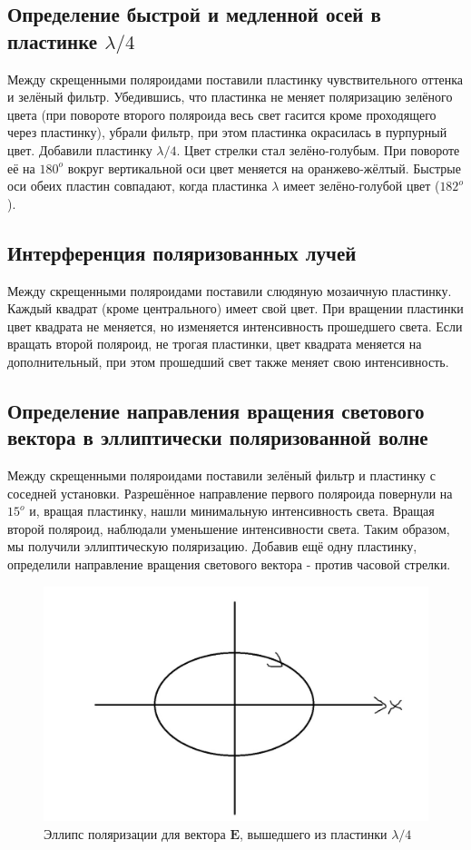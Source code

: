 \subsection*{Определение быстрой и медленной осей в пластинке $\lambda/4$}
Между скрещенными поляроидами поставили пластинку чувствительного оттенка и зелёный фильтр. Убедившись, что пластинка не меняет поляризацию зелёного цвета (при повороте второго поляроида весь свет гасится кроме проходящего через пластинку), убрали фильтр, при этом пластинка окрасилась в пурпурный цвет. Добавили пластинку $\lambda/4$. Цвет стрелки стал зелёно-голубым. При повороте её на $180^o$ вокруг вертикальной оси цвет меняется на оранжево-жёлтый. Быстрые оси обеих пластин совпадают, когда пластинка $\lambda$ имеет зелёно-голубой цвет ($182^o$).
\subsection*{Интерференция поляризованных лучей}
Между скрещенными поляроидами поставили слюдяную мозаичную пластинку. Каждый квадрат (кроме центрального) имеет свой цвет. При вращении пластинки цвет квадрата не меняется, но изменяется интенсивность прошедшего света. Если вращать второй поляроид, не трогая пластинки, цвет квадрата меняется на дополнительный, при этом прошедший свет также меняет свою интенсивность.
\subsection*{Определение направления вращения светового вектора в эллиптически поляризованной волне}
Между скрещенными поляроидами поставили зелёный фильтр и пластинку с соседней установки. Разрешённое направление первого поляроида повернули на $15^o$ и, вращая пластинку, нашли минимальную интенсивность света. Вращая второй поляроид, наблюдали уменьшение интенсивности света. Таким образом, мы получили эллиптическую поляризацию. Добавив ещё одну пластинку, определили направление вращения светового вектора - против часовой стрелки.
\begin{figure}[H]
	\centering
	\includegraphics[width=15cm]{2.jpg}
	\caption{Эллипс поляризации для вектора $\bm{E}$, вышедшего из пластинки $\lambda/4$}
\end{figure}

